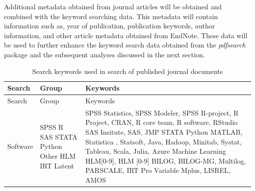\documentclass[english,,man]{apa6}
\theoremstyle{definition}
\theoremstyle{definition}
\theoremstyle{definition}
\theoremstyle{remark}
\begin{document}
Additional metadata obtained from journal articles will be obtained and
combined with the keyword searching data. This metadata will contain
information such as, year of publication, publication keywords, author
information, and other article metadata obtained from EndNote. These
data will be used to further enhance the keyword search data obtained
from the \emph{pdfsearch} package and the subsequent analyses discussed
in the next section.

\begin{longtable}[]{@{}lll@{}}
\caption{\label{tab:searchwords} Search keywords used in search of published
journal documents}\tabularnewline
\toprule
\begin{minipage}[b]{0.20\columnwidth}\raggedright
Search\strut
\end{minipage} & \begin{minipage}[b]{0.10\columnwidth}\raggedright
Group\strut
\end{minipage} & \begin{minipage}[b]{0.37\columnwidth}\raggedright
Keywords\strut
\end{minipage}\tabularnewline
\midrule
\endfirsthead
\toprule
\begin{minipage}[b]{0.20\columnwidth}\raggedright
Search\strut
\end{minipage} & \begin{minipage}[b]{0.10\columnwidth}\raggedright
Group\strut
\end{minipage} & \begin{minipage}[b]{0.37\columnwidth}\raggedright
Keywords\strut
\end{minipage}\tabularnewline
\midrule
\endhead
\begin{minipage}[t]{0.20\columnwidth}\raggedright
Software\strut
\end{minipage} & \begin{minipage}[t]{0.10\columnwidth}\raggedright
SPSS R SAS STATA Python Other HLM IRT Latent\strut
\end{minipage} & \begin{minipage}[t]{0.37\columnwidth}\raggedright
SPSS Statistics, SPSS Modeler, SPSS R-project, R Project, CRAN, R core
team, R software, RStudio SAS Insitute, SAS, JMP STATA \textbar{} Python
MATLAB, Statistica , Statsoft, Java, Hadoop, Minitab, Systat, Tableau,
Scala, Julia, Azure Machine Learning HLM{[}0-9{]}, HLM {[}0-9{]} BILOG,
BILOG-MG, Multilog, PARSCALE, IRT Pro Variable \textbar{} Mplus, LISREL,
AMOS\strut
\end{minipage}\tabularnewline

\end{longtable}
\end{document}

